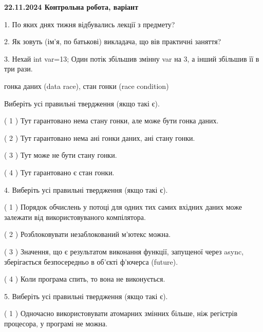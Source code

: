 \documentclass[12pt, ukrainian]{article}
\begin{document}
\vspace{4mm}
\newpage
\begin {large}

\textbf{22.11.2024 Контрольна робота, варіант  }\par


{
1. По яких днях тижня відбувались лекції з предмету?



\vspace{5mm}
2. Як зовуть (ім'я, по батькові) викладача, що вів практичні заняття?



\vspace{5mm}
3. Нехай int var=13; Один потік збільшив змінну var на 3, а інший збільшив її в три рази.

гонка даних (data race), стан гонки (race condition)

Виберіть усі правильні твердження (якщо такі є).\par
\vspace{2mm}
( 1 ) Тут гарантовано нема стану гонки, але може бути гонка даних.%

( 2 ) Тут гарантовано нема ані гонки даних, ані стану гонки.%

( 3 ) Тут може не бути стану гонки.%

( 4 ) Тут гарантовано є стан гонки.%


\vspace{5mm}
4. Виберіть усі правильні твердження (якщо такі є).\par
\vspace{2mm}

( 1 ) Порядок обчислень у потоці для одних тих самих вхідних даних може залежати від використовуваного компілятора.%

( 2 ) Розблоковувати незаблокований м’ютекс можна.%

( 3 ) Значення, що є результатом виконання функції, запущеної через async, зберігається безпосередньо в об’єкті ф’ючерса (future).%

( 4 ) Коли програма спить, то вона не виконується.%


\vspace{5mm}
5. Виберіть усі правильні твердження (якщо такі є).\par
\vspace{2mm}

( 1 ) Одночасно використовувати атомарних змінних більше, ніж регістрів процесора, у програмі не можна.%

}
\end{large}
\end{document}
